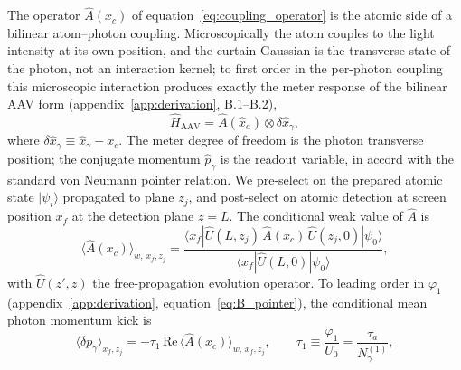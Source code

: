 \documentclass[11pt,a4paper]{article}
\newcommand{\bra}[1]{\langle #1 |}
\newcommand{\ket}[1]{| #1 \rangle}
\newcommand{\weakvalps}[2]{\langle #1 \rangle_{w,\,#2}}
\begin{document}
The operator $\hat{A}(x_c)$ of equation~\eqref{eq:coupling_operator} is the atomic side of a bilinear atom--photon coupling. Microscopically the atom couples to the light intensity at its own position, and the curtain Gaussian is the transverse state of the photon, not an interaction kernel; to first order in the per-photon coupling this microscopic interaction produces exactly the meter response of the bilinear AAV form (appendix~\ref{app:derivation}, B.1--B.2),
\begin{equation}
\hat{H}_\text{AAV} = \hat{A}(\hat{x}_a)\otimes\delta\hat{x}_\gamma,
\label{eq:AAV_form}
\end{equation}
where $\delta\hat{x}_\gamma \equiv \hat{x}_\gamma - x_c$. The meter degree of freedom is the photon transverse position; the conjugate momentum $\hat{p}_\gamma$ is the readout variable, in accord with the standard von Neumann pointer relation. We pre-select on the prepared atomic state $\ket{\psi_i}$ propagated to plane $z_j$, and post-select on atomic detection at screen position $x_f$ at the detection plane $z = L$. The conditional weak value of $\hat{A}$ is
\begin{equation}
\weakvalps{\hat{A}(x_c)}{x_f, z_j} = \frac{\bra{x_f}\hat{U}(L, z_j)\,\hat{A}(x_c)\,\hat{U}(z_j, 0)\ket{\psi_0}}{\bra{x_f}\hat{U}(L, 0)\ket{\psi_0}},
\label{eq:weak_value_def}
\end{equation}
with $\hat{U}(z', z)$ the free-propagation evolution operator. To leading order in $\varphi_1$ (appendix~\ref{app:derivation}, equation~\eqref{eq:B_pointer}), the conditional mean photon momentum kick is
\begin{equation}
\langle \delta p_\gamma\rangle_{x_f, z_j} = -\tau_1\,\mathrm{Re}\,\weakvalps{\hat{A}(x_c)}{x_f, z_j},
\qquad \tau_1 \equiv \frac{\varphi_1}{U_0} = \frac{\tau_a}{N_\gamma^{(1)}},
\label{eq:kick_weakval}
\end{equation}
\end{document}
